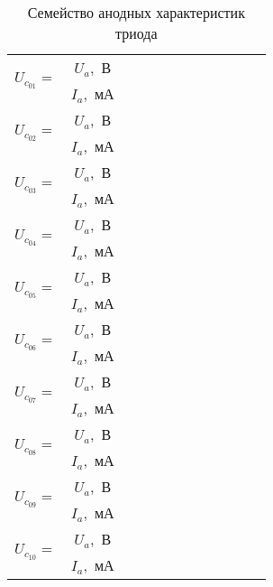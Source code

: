     \pagebreak
    
    \begin{table}[h!]
        \center
        \caption{Семейство анодных характеристик триода}
        \begin{tabular}{|m{}|*{11}{C{.05}|}} \hline
         &
            \( U_a \),~В &&&&&&&&&& \\ 
        & \( I_a \),~мА &&&&&&&&&& \\ \hline
         &
            \( U_a \),~В &&&&&&&&&& \\ 
        & \( I_a \),~мА &&&&&&&&&& \\ \hline
         &
            \( U_a \),~В &&&&&&&&&& \\ 
        & \( I_a \),~мА &&&&&&&&&& \\ \hline
         &
            \( U_a \),~В &&&&&&&&&& \\ 
        & \( I_a \),~мА &&&&&&&&&& \\ \hline
         &
            \( U_a \),~В &&&&&&&&&& \\ 
        & \( I_a \),~мА &&&&&&&&&& \\ \hline
         &
            \( U_a \),~В &&&&&&&&&& \\ 
        & \( I_a \),~мА &&&&&&&&&& \\ \hline
         &
            \( U_a \),~В &&&&&&&&&& \\ 
        & \( I_a \),~мА &&&&&&&&&& \\ \hline
         &
            \( U_a \),~В &&&&&&&&&& \\ 
        & \( I_a \),~мА &&&&&&&&&& \\ \hline
         &
            \( U_a \),~В &&&&&&&&&& \\ 
        & \( I_a \),~мА &&&&&&&&&& \\ \hline
         &
            \( U_a \),~В &&&&&&&&&& \\ 
        & \( I_a \),~мА &&&&&&&&&& \\ \hline
        \end{tabular}
    \end{table}

